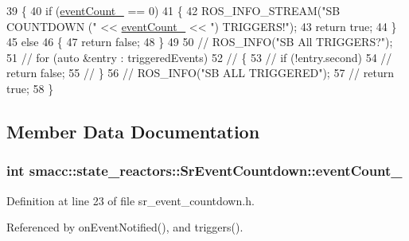 \begin{DoxyCode}
39 \{
40     \textcolor{keywordflow}{if} (\hyperlink{classsmacc_1_1state__reactors_1_1SrEventCountdown_aa3b1de656f3d3cadadc47f00c4e0be86}{eventCount\_} == 0)
41     \{
42         ROS\_INFO\_STREAM(\textcolor{stringliteral}{"SB COUNTDOWN ("} << \hyperlink{classsmacc_1_1state__reactors_1_1SrEventCountdown_aa3b1de656f3d3cadadc47f00c4e0be86}{eventCount\_} << \textcolor{stringliteral}{") TRIGGERS!"});
43         \textcolor{keywordflow}{return} \textcolor{keyword}{true};
44     \}
45     \textcolor{keywordflow}{else}
46     \{
47         \textcolor{keywordflow}{return} \textcolor{keyword}{false};
48     \}
49 
50     \textcolor{comment}{// ROS\_INFO("SB All TRIGGERS?");}
51     \textcolor{comment}{// for (auto &entry : triggeredEvents)}
52     \textcolor{comment}{// \{}
53     \textcolor{comment}{//     if (!entry.second)}
54     \textcolor{comment}{//         return false;}
55     \textcolor{comment}{// \}}
56     \textcolor{comment}{// ROS\_INFO("SB ALL TRIGGERED");}
57     \textcolor{comment}{// return true;}
58 \}
\end{DoxyCode}


\subsection{Member Data Documentation}
\subsubsection[{\texorpdfstring{event\+Count\+\_\+}{eventCount_}}]{\setlength{\rightskip}{0pt plus 5cm}int smacc\+::state\+\_\+reactors\+::\+Sr\+Event\+Countdown\+::event\+Count\+\_\+\hspace{0.3cm}{\ttfamily [private]}}\hypertarget{classsmacc_1_1state__reactors_1_1SrEventCountdown_aa3b1de656f3d3cadadc47f00c4e0be86}{}\label{classsmacc_1_1state__reactors_1_1SrEventCountdown_aa3b1de656f3d3cadadc47f00c4e0be86}


Definition at line 23 of file sr\+\_\+event\+\_\+countdown.\+h.



Referenced by on\+Event\+Notified(), and triggers().

